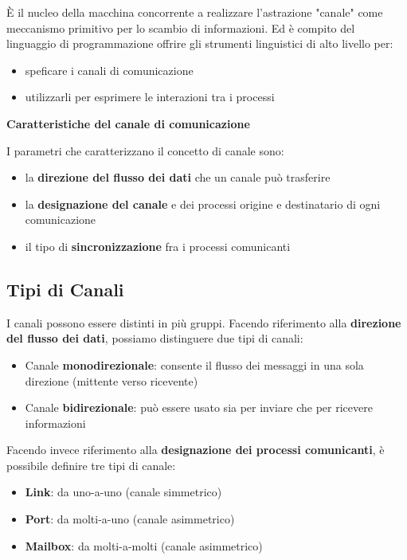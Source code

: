 \documentclass{article}
\begin{document}
È il nucleo della macchina concorrente a realizzare l'astrazione "canale" come meccanismo primitivo per lo scambio di informazioni. Ed è compito del linguaggio di programmazione offrire
gli strumenti linguistici di alto livello per:
\begin{itemize}
    \item speficare i canali di comunicazione
    \item utilizzarli per esprimere le interazioni tra i processi
\end{itemize}

\vspace{5mm}
\textbf{Caratteristiche del canale di comunicazione}
\vspace{3mm}

I parametri che caratterizzano il concetto di canale sono:
\begin{itemize}
    \item la \textbf{direzione del flusso dei dati} che un canale può trasferire
    \item la \textbf{designazione del canale} e dei processi origine e destinatario di ogni comunicazione
    \item il tipo di \textbf{sincronizzazione} fra i processi comunicanti
\end{itemize}

\subsection{Tipi di Canali}

I canali possono essere distinti in più gruppi. Facendo riferimento alla \textbf{direzione del flusso dei dati}, possiamo distinguere due tipi di canali:
\begin{itemize}
    \item Canale \textbf{monodirezionale}: consente il flusso dei messaggi in una sola direzione (mittente verso ricevente)
    \item Canale \textbf{bidirezionale}: può essere usato sia per inviare che per ricevere informazioni
\end{itemize}

\vspace{3mm}
Facendo invece riferimento alla \textbf{designazione dei processi comunicanti}, è possibile definire tre tipi di canale:
\begin{itemize}
    \item \textbf{Link}: da uno-a-uno (canale simmetrico)
    \item \textbf{Port}: da molti-a-uno (canale asimmetrico)
    \item \textbf{Mailbox}: da molti-a-molti (canale asimmetrico)
\end{itemize}
\end{document}
